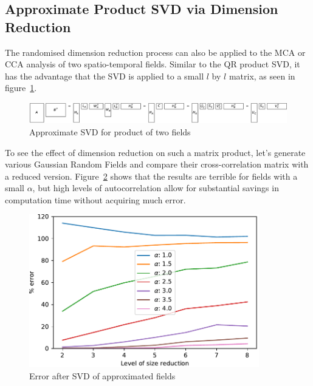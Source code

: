 \documentclass[ijgi,article,submit,moreauthors,pdftex,10pt,a4paper]{Definitions/mdpi}
\begin{document}
\subsection{Approximate Product SVD via Dimension Reduction}
\label{sec:Materials and Methods/Approximate SVD via Dimension Reduction}

The randomised dimension reduction process can also be applied to the MCA or CCA analysis of two spatio-temporal fields. Similar to the QR product SVD, it has the advantage that the SVD is applied to a small $l$ by $l$ matrix, as seen in figure~\ref{fig:randomisedSquareProductSVD}.

\begin{figure}[H]
\centering
\includegraphics[width=120mm]{Results/randomisedSquareProductSVD.pdf}
\caption[Approximate product SVD]{Approximate SVD for product of two fields}
\label{fig:randomisedSquareProductSVD}
\end{figure}

To see the effect of dimension reduction on such a matrix product, let's generate various Gaussian Random Fields and compare their cross-correlation matrix with a reduced version. Figure~\ref{fig:plotRandomisedSizeReducedMatrixProduct} shows that the results are terrible for fields with a small $\alpha$, but high levels of autocorrelation allow for substantial savings in computation time without acquiring much error.

\begin{figure}[H]
\centering
\includegraphics[width=100mm]{Results/plotRandomisedSizeReducedMatrixProduct.pdf}
\caption[Error after SVD]{Error after SVD of approximated fields}
\label{fig:plotRandomisedSizeReducedMatrixProduct}
\end{figure}
\end{document}
